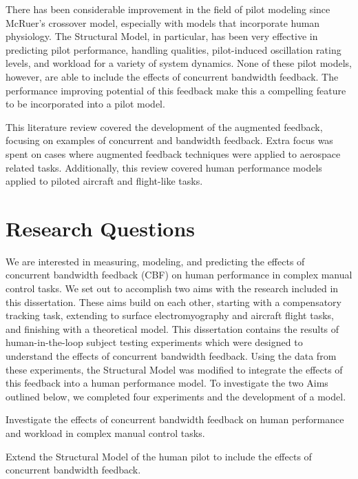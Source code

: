 There has been considerable improvement in the field of pilot modeling since McRuer's crossover model, especially with models that incorporate human physiology.
The Structural Model, in particular, has been very effective in predicting pilot performance, handling qualities, pilot-induced oscillation rating levels, and workload for a variety of system dynamics.
None of these pilot models, however, are able to include the effects of concurrent bandwidth feedback.
The performance improving potential of this feedback make this a compelling feature to be incorporated into a pilot model.

This literature review covered the development of the augmented feedback, focusing on examples of concurrent and bandwidth feedback.
Extra focus was spent on cases where augmented feedback techniques were applied to aerospace related tasks.
Additionally, this review covered human performance models applied to piloted aircraft and flight-like tasks.

\section{Research Questions}
\label{sec:intro_questions}
We are interested in measuring, modeling, and predicting the effects of concurrent bandwidth feedback (CBF) on human performance in complex manual control tasks.
We set out to accomplish two aims with the research included in this dissertation.
These aims build on each other, starting with a compensatory tracking task, extending to surface electromyography and aircraft flight tasks, and finishing with a theoretical model.
This dissertation contains the results of human-in-the-loop subject testing experiments which were designed to understand the effects of concurrent bandwidth feedback.
Using the data from these experiments, the Structural Model was modified to integrate the effects of this feedback into a human performance model.
To investigate the two Aims outlined below, we completed four experiments and the development of a model.

\begin{description}[align=left]
    \item [Aim One] Investigate the effects of concurrent bandwidth feedback on human performance and workload in complex manual control tasks.
    \item [Aim Two] Extend the Structural Model of the human pilot to include the effects of concurrent bandwidth feedback.
\end{description}

